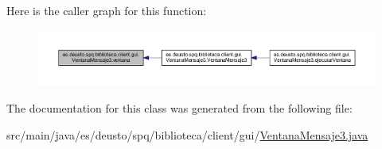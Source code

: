 Here is the caller graph for this function\+:
\nopagebreak
\begin{figure}[H]
\begin{center}
\leavevmode
\includegraphics[width=350pt]{classes_1_1deusto_1_1spq_1_1biblioteca_1_1client_1_1gui_1_1_ventana_mensaje3_a9e0e23158e6fcc44783491bf9d48e98d_icgraph}
\end{center}
\end{figure}


The documentation for this class was generated from the following file\+:\begin{DoxyCompactItemize}
\item 
src/main/java/es/deusto/spq/biblioteca/client/gui/\mbox{\hyperlink{_ventana_mensaje3_8java}{Ventana\+Mensaje3.\+java}}\end{DoxyCompactItemize}
